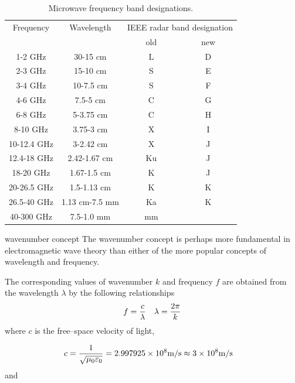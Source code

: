 \documentclass[10pt]{beamer}
\begin{document}
\begin{frame}[fragile]{}
%

\begin{table}[bt]
\caption{Microwave frequency band designations.}
\vspace{0.1in}
\center
\small
%
\begin{tabular}{ c c c c } \hline \hline
\multicolumn{1}{c}{Frequency} &	\multicolumn{1}{c}{Wavelength} &	
\multicolumn{2}{c}{IEEE radar band designation} \\ \cline{3-4} 
              &                & old & new \\ \hline
1-2 GHz      	& 30-15 cm        &	L  & D    \\
2-3  GHz	     & 15-10 cm        &	S  & E   \\
3-4  GHz	     & 10-7.5 cm       &	S  & F   \\
4-6 GHz      	&  7.5-5 cm       &	C  & G   \\
6-8 GHz      	&  5-3.75 cm      &	C  & H   \\
8-10 GHz	     &  3.75-3 cm      &	X  & I   \\
10-12.4 GHz	  &  3-2.42 cm      &	X  & J   \\
12.4-18 GHz  	&  2.42-1.67 cm   &	Ku & J   \\
18-20 GHz    	&  1.67-1.5 cm    &	K  & J    \\
20-26.5 GHz  	&  1.5-1.13 cm    &	K  & K  \\
26.5-40 GHz  	&  1.13 cm-7.5 mm &	Ka & K  \\
40-300 GHz   	&  7.5-1.0 mm     &	mm &    \\
\hline \hline
\end{tabular}
\normalsize
\label{IEEEband}
\end{table}

\end{frame}
\begin{frame}[fragile]{wavenumber concept}
%
The \alert{wavenumber} concept  is 
perhaps more   fundamental  in  electromagnetic  wave
theory   than  either  of  the  more  popular
concepts  of  \alert{wavelength and  frequency}.  

The
corresponding   values   of   wavenumber $k$ and
frequency $f$  are obtained from the wavelength $\lambda$ by
the following relationships
%
\begin{eqnarray}
f = {c \over \lambda} & & \lambda={2 \pi \over k}
\end{eqnarray}
%
where $c$ is the free--space velocity of light, 
%

%
\begin{eqnarray}
c = {1 \over 
 \sqrt{ \mu_{0} \varepsilon_{0} } } = 2.997925 \times 10^{8} 
 \mbox{m/s}
 \approx 3 \times 10^{8} \mbox{m/s}  & & \nonumber \\
%
\end{eqnarray}
and
 
%
\end{frame}
\end{document}
